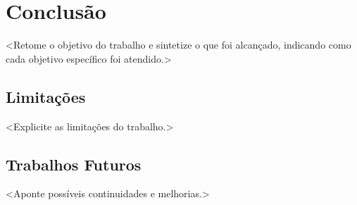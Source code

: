 \chapter[Conclusão]{Conclusão}\label{ch:conclusao}

<Retome o objetivo do trabalho e sintetize o que foi alcançado, indicando
como cada objetivo específico foi atendido.>

\section{Limitações}\label{sec:limitacoes}

<Explicite as limitações do trabalho.>

\section{Trabalhos Futuros}\label{sec:trabalhos_futuros}

<Aponte possíveis continuidades e melhorias.>
